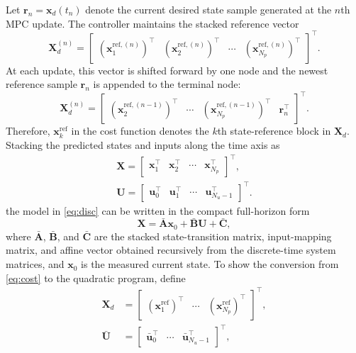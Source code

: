 \documentclass[5p,times]{elsarticle}
\begin{document}
Let $\bm r_n=\bm x_d(t_n)$ denote the current desired state sample generated at the $n$th MPC update. The controller maintains the stacked reference vector
\begin{equation}
\bm X_d^{(n)}
=
\begin{bmatrix}
(\bm x_{1}^{\text{ref},(n)})^\top &
(\bm x_{2}^{\text{ref},(n)})^\top &
\cdots &
(\bm x_{N_p}^{\text{ref},(n)})^\top
\end{bmatrix}^{\top}.
\label{eq:rolling_ref}
\end{equation}
At each update, this vector is shifted forward by one node and the newest reference sample $\bm r_n$ is appended to the terminal node:
\begin{equation}
\bm X_d^{(n)}
=
\begin{bmatrix}
(\bm x_{2}^{\text{ref},(n-1)})^\top &
\cdots &
(\bm x_{N_p}^{\text{ref},(n-1)})^\top &
\bm r_n^\top
\end{bmatrix}^{\top}.
\label{eq:rolling_ref_update}
\end{equation}
Therefore, $\bm x_k^{\text{ref}}$ in the cost function denotes the $k$th state-reference block in $\bm X_d$. Stacking the predicted states and inputs along the time axis as
\begin{equation}
\begin{aligned}
\bm X=
\begin{bmatrix}\bm x_1^\top&\bm x_2^\top&\cdots&\bm x_{N_p}^\top\end{bmatrix}^\top,\\
\bm U=
\begin{bmatrix}\bm u_0^\top&\bm u_1^\top&\cdots&\bm u_{N_u-1}^\top\end{bmatrix}^\top.
\end{aligned}
\label{eq:stack}
\end{equation}
the model in \eqref{eq:disc} can be written in the compact full-horizon form
\begin{equation}
\bm X=\bar{\bm A}\bm x_0+\bar{\bm B}\bm U+\bar{\bm C},
\label{eq:predcompact}
\end{equation}
where $\bar{\bm A}$, $\bar{\bm B}$, and $\bar{\bm C}$ are the stacked state-transition matrix, input-mapping matrix, and affine vector obtained recursively from the discrete-time system matrices, and $\bm x_0$ is the measured current state. To show the conversion from \eqref{eq:cost} to the quadratic program, define
\begin{equation}
\begin{aligned}
\bm X_d&=\begin{bmatrix}(\bm x_1^{\text{ref}})^\top&\cdots&(\bm x_{N_p}^{\text{ref}})^\top\end{bmatrix}^{\top},\\
\bar{\bm U}&=\begin{bmatrix}\bar{\bm u}_0^\top&\cdots&\bar{\bm u}_{N_u-1}^\top\end{bmatrix}^{\top},
\end{aligned}
\label{eq:stacked_ref_input}
\end{equation}
\end{document}

